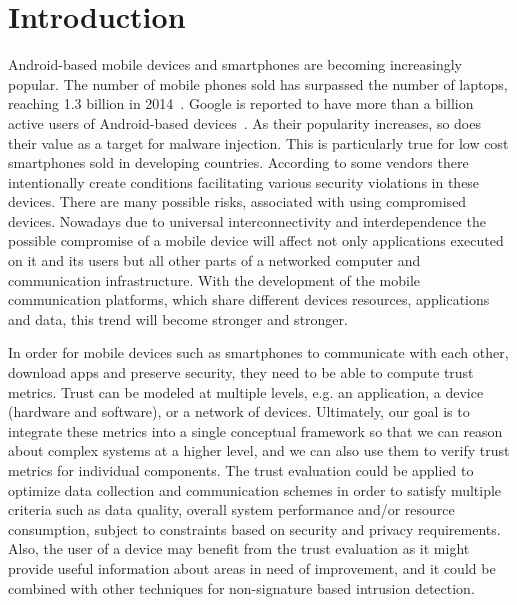 \section{Introduction}

Android-based mobile devices and smartphones are becoming increasingly popular.  The number of mobile phones
sold has surpassed the number of laptops, reaching 1.3 billion in 
2014~\cite{market}.  Google is 
reported to have more than a billion active users of 
Android-based devices~\cite{android-users}.  
As their popularity increases, so does their value as
a target for malware injection.  
This is particularly true for low cost smartphones sold in developing countries. According to \cite{zheng2014droidray}
some vendors there intentionally create conditions facilitating various security violations in these devices.
 There are many possible risks, associated with using compromised devices.  Nowadays due to universal interconnectivity and 
interdependence the 
possible compromise of a mobile device will affect not only applications executed on it and its users but all other parts 
of a networked computer and communication infrastructure.
With the development of the mobile communication platforms, which share different devices resources, applications and data, 
this trend will become stronger and stronger. 

In order for mobile devices such as smartphones to communicate with each other, download apps and preserve security,
they need to be able to compute trust metrics.   Trust can be modeled at 
multiple levels, e.g. an application, a device (hardware and software), or a network of devices.  Ultimately, our goal
is to integrate these metrics into a single conceptual framework so that we can reason about complex systems at a  
higher level, and we can also use them to verify trust metrics for individual components.
The trust evaluation  could 
be applied to optimize data collection and communication schemes in order to satisfy multiple criteria such as 
data quality, overall
system performance and/or resource consumption, subject to constraints based on security and privacy requirements.
Also, the user of a device may benefit from the trust evaluation as it might 
provide useful information about areas in need of improvement, and it could be combined with other techniques for
 non-signature based intrusion detection.

